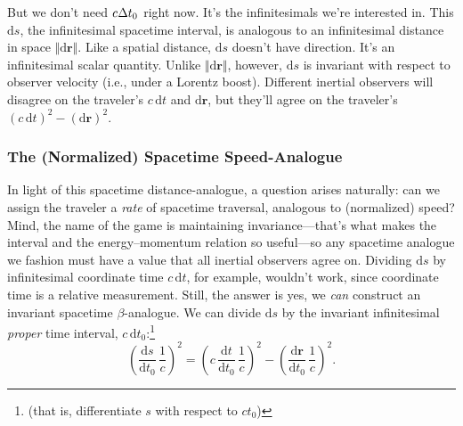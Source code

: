 \documentclass[12pt]{article}
\renewcommand{\vv}[1]{\mathbf{#1}}
\newcommand{\dd}[1]{\mathrm{d}#1}
\begin{document}
But we don't need $c \mkern.5mu \Delta t_0$ right now. It's the infinitesimals we're interested in. This $\dd s$, the infinitesimal spacetime interval, is analogous to an infinitesimal distance in space $\Vert \dd \vv r \Vert$. Like a spatial distance, $\dd s$ doesn't have direction. It's an infinitesimal scalar quantity. Unlike $\Vert \dd \vv r \Vert$, however, $\dd s$ is invariant with respect to observer velocity (i.e., under a Lorentz boost). Different inertial observers will disagree on the traveler's $c \, \dd t$ and $\dd \vv r$, but they'll agree on the traveler's $(c \, \dd t)^2 - (\dd \vv r)^2$.

\subsubsection{The (Normalized) Spacetime Speed-Analogue}\label{sssec:b}

In light of this spacetime distance-analogue, a question arises naturally: can we assign the traveler a \emph{rate} of spacetime traversal, analogous to (normalized) speed? Mind, the name of the game is maintaining invariance---that's what makes the interval and the energy--momentum relation so useful---so any spacetime analogue we fashion must have a value that all inertial observers agree on. Dividing $\dd s$ by infinitesimal coordinate time $c \, \dd t$, for example, wouldn't work, since coordinate time is a relative measurement. Still, the answer is yes, we \emph{can} construct an invariant spacetime $\beta$-analogue. We can divide $\dd s$ by the invariant infinitesimal \emph{proper} time interval, $c \, \dd t_0$:\footnote{(that is, differentiate $s$ with respect to $ct_0$)}
\begin{equation*}
\left(\dfrac{\dd s}{\dd t_0} \, \dfrac{1}{c}\right)^2 = \left(c \, \dfrac{\dd t}{\dd t_0} \, \dfrac{1}{c}\right)^2 - \left(\dfrac{\dd \vv r}{\dd t_0} \, \dfrac{1}{c}\right)^2.
\end{equation*}
\end{document}
